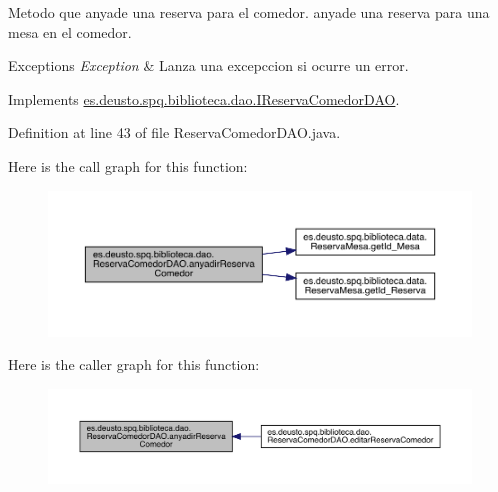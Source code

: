 Metodo que anyade una reserva para el comedor.  anyade una reserva para una mesa en el comedor. 
\begin{DoxyExceptions}{Exceptions}
{\em Exception} & Lanza una excepccion si ocurre un error. \\
\hline
\end{DoxyExceptions}


Implements \mbox{\hyperlink{interfacees_1_1deusto_1_1spq_1_1biblioteca_1_1dao_1_1_i_reserva_comedor_d_a_o_a049782a184cf43fcead41207aaf91e0b}{es.\+deusto.\+spq.\+biblioteca.\+dao.\+I\+Reserva\+Comedor\+D\+AO}}.



Definition at line 43 of file Reserva\+Comedor\+D\+A\+O.\+java.

Here is the call graph for this function\+:
\nopagebreak
\begin{figure}[H]
\begin{center}
\leavevmode
\includegraphics[width=350pt]{classes_1_1deusto_1_1spq_1_1biblioteca_1_1dao_1_1_reserva_comedor_d_a_o_a00a9d306bae663d51886fb00f0838d45_cgraph}
\end{center}
\end{figure}
Here is the caller graph for this function\+:
\nopagebreak
\begin{figure}[H]
\begin{center}
\leavevmode
\includegraphics[width=350pt]{classes_1_1deusto_1_1spq_1_1biblioteca_1_1dao_1_1_reserva_comedor_d_a_o_a00a9d306bae663d51886fb00f0838d45_icgraph}
\end{center}
\end{figure}
\mbox{\label{classes_1_1deusto_1_1spq_1_1biblioteca_1_1dao_1_1_reserva_comedor_d_a_o_adf9fa1cb08488112692797e7959b2ef8}} 
